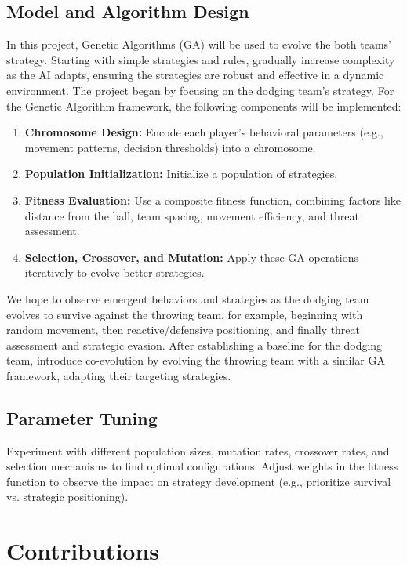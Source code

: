 \documentclass[12pt,letterpaper]{article}
\begin{document}
\subsection{Model and Algorithm Design}
In this project, Genetic Algorithms (GA) will be used to evolve the both teams' strategy.
Starting with simple strategies and rules, gradually increase complexity as the AI adapts, ensuring the strategies are robust and effective in a dynamic environment. The project began by focusing on the dodging team’s strategy. For the Genetic Algorithm framework, the following components will be implemented:
\begin{enumerate}
    \item \textbf{Chromosome Design:} Encode each player's behavioral parameters (e.g., movement patterns, decision thresholds) into a chromosome.
    \item \textbf{Population Initialization:} Initialize a population of strategies.
    \item \textbf{Fitness Evaluation:} Use a composite fitness function, combining factors like distance from the ball, team spacing, movement efficiency, and threat assessment.
    \item \textbf{Selection, Crossover, and Mutation:} Apply these GA operations iteratively to evolve better strategies.
\end{enumerate}
We hope to observe emergent behaviors and strategies as the dodging team evolves to survive against the throwing team, for example,
beginning with random movement, then reactive/defensive positioning, and finally threat assessment and strategic evasion. After establishing a baseline for the dodging team, introduce co-evolution by evolving the throwing team with a similar GA framework, adapting their targeting strategies.

\subsection{Parameter Tuning}

Experiment with different population sizes, mutation rates, crossover rates, and selection mechanisms to find optimal configurations.
Adjust weights in the fitness function to observe the impact on strategy development (e.g., prioritize survival vs. strategic positioning).

\section{Contributions}
\end{document}
